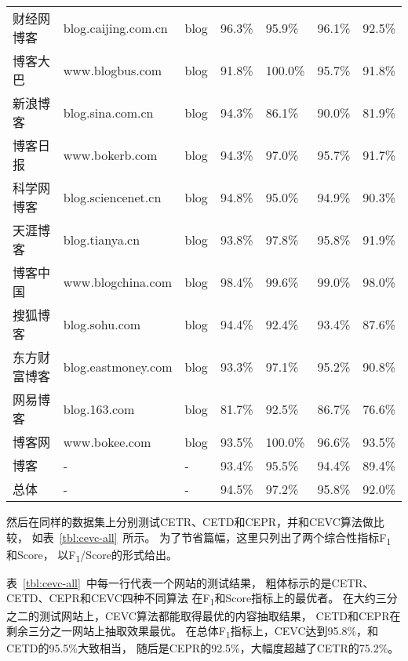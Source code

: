 \begin{table}[htbp]
\begin{tabular}{lllllll}
财经网博客 & blog.caijing.com.cn & blog & 96.3\% & 95.9\% & 96.1\% & 92.5\% \\
博客大巴 & www.blogbus.com & blog & 91.8\% & 100.0\% & 95.7\% & 91.8\% \\
新浪博客 & blog.sina.com.cn & blog & 94.3\% & 86.1\% & 90.0\% & 81.9\% \\
博客日报 & www.bokerb.com & blog & 94.3\% & 97.0\% & 95.7\% & 91.7\% \\
科学网博客 & blog.sciencenet.cn & blog & 94.8\% & 95.0\% & 94.9\% & 90.3\% \\
天涯博客 & blog.tianya.cn & blog & 93.8\% & 97.8\% & 95.8\% & 91.9\% \\
博客中国 & www.blogchina.com & blog & 98.4\% & 99.6\% & 99.0\% & 98.0\% \\
搜狐博客 & blog.sohu.com & blog & 94.4\% & 92.4\% & 93.4\% & 87.6\% \\
东方财富博客 & blog.eastmoney.com & blog & 93.3\% & 97.1\% & 95.2\% & 90.8\% \\
网易博客 & blog.163.com & blog & 81.7\% & 92.5\% & 86.7\% & 76.6\% \\
博客网 & www.bokee.com & blog & 93.5\% & 100.0\% & 96.6\% & 93.5\% \\
博客 & - & - & 93.4\% & 95.5\% & 94.4\% & 89.4\% \\
\hline
总体 & - & - & 94.5\% & 97.2\% & 95.8\% & 92.0\% \\
\bottomrule[1.5pt]
\end{tabular}
\end{table}

然后在同样的数据集上分别测试CETR、CETD和CEPR，并和CEVC算法做比较，
如表~\ref{tbl:cevc-all}~所示。
为了节省篇幅，这里只列出了两个综合性指标F\textsubscript{1}和Score，
以F\textsubscript{1}/Score的形式给出。

表~\ref{tbl:cevc-all}~中每一行代表一个网站的测试结果，
粗体标示的是CETR、CETD、CEPR和CEVC四种不同算法
在F\textsubscript{1}和Score指标上的最优者。
在大约三分之二的测试网站上，CEVC算法都能取得最优的内容抽取结果，
CETD和CEPR在剩余三分之一网站上抽取效果最优。
在总体F\textsubscript{1}指标上，CEVC达到95.8\%，和CETD的95.5\%大致相当，
随后是CEPR的92.5\%，大幅度超越了CETR的75.2\%。

